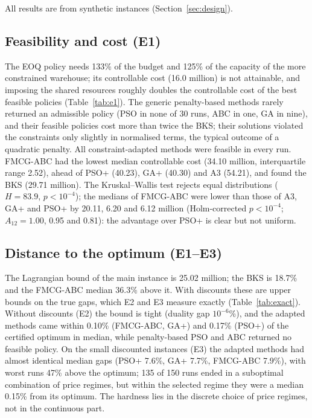 All results are from synthetic instances (Section~\ref{sec:design}).

\subsection{Feasibility and cost (E1)}\label{sec:res-e1}
The EOQ policy needs 133\% of the budget and 125\% of the capacity of the more constrained warehouse; its controllable cost (16.0 million) is not attainable, and imposing the shared resources roughly doubles the controllable cost of the best feasible policies (Table~\ref{tab:e1}). The generic penalty-based methods rarely returned an admissible policy (PSO in none of 30 runs, ABC in one, GA in nine), and their feasible policies cost more than twice the BKS; their solutions violated the constraints only slightly in normalised terms, the typical outcome of a quadratic penalty. All constraint-adapted methods were feasible in every run. FMCG-ABC had the lowest median controllable cost (34.10 million, interquartile range 2.52), ahead of PSO+ (40.23), GA+ (40.30) and A3 (54.21), and found the BKS (29.71 million). The Kruskal--Wallis test rejects equal distributions ($H=83.9$, $p<10^{-4}$); the medians of FMCG-ABC were lower than those of A3, GA+ and PSO+ by 20.11, 6.20 and 6.12 million (Holm-corrected $p<10^{-4}$; $A_{12}=1.00$, 0.95 and 0.81): the advantage over PSO+ is clear but not uniform.



\subsection{Distance to the optimum (E1--E3)}\label{sec:res-gap}
The Lagrangian bound of the main instance is 25.02 million; the BKS is 18.7\% and the FMCG-ABC median 36.3\% above it. With discounts these are upper bounds on the true gaps, which E2 and E3 measure exactly (Table~\ref{tab:exact}). Without discounts (E2) the bound is tight (duality gap $10^{-6}$\%), and the adapted methods came within 0.10\% (FMCG-ABC, GA+) and 0.17\% (PSO+) of the certified optimum in median, while penalty-based PSO and ABC returned no feasible policy. On the small discounted instances (E3) the adapted methods had almost identical median gaps (PSO+ 7.6\%, GA+ 7.7\%, FMCG-ABC 7.9\%), with worst runs 47\% above the optimum; 135 of 150 runs ended in a suboptimal combination of price regimes, but within the selected regime they were a median 0.15\% from its optimum. The hardness lies in the discrete choice of price regimes, not in the continuous part.

